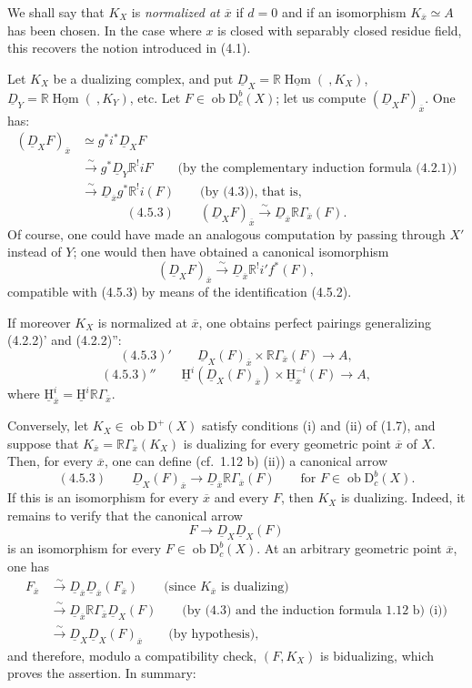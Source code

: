 \documentclass[11pt]{article}
\providecommand{\uH}{\underline{\mathrm H}}
\DeclareMathOperator{\Hom}{Hom}
\newcommand{\D}{\mathrm{D}}
\newcommand{\ob}{\operatorname{ob}}
\newcommand{\ol}[1]{\overline{#1}}
\providecommand{\Hom}{\operatorname{Hom}}
\providecommand{\ob}{\operatorname{ob}}
\providecommand{\Hom}{\operatorname{Hom}}
\begin{document}
We shall say that $K_X$ is \emph{normalized at $\ol{x}$} if $d=0$ and if an isomorphism $K_{\ol{x}}\simeq A$ has been chosen. In the case where $x$ is closed with separably closed residue field, this recovers the notion introduced in (4.1).

Let $K_X$ be a dualizing complex, and put $\underline{D}_X=\mathbb{R}\underline{\Hom}(\ ,K_X)$, $\underline{D}_Y=\mathbb{R}\underline{\Hom}(\ ,K_Y)$, etc. Let $F\in\ob\D_c^b(X)$; let us compute $(\underline{D}_XF)_{\ol{x}}$. One has:
\[
\begin{aligned}
(\underline{D}_XF)_{\ol{x}}&\simeq g^*i^*\underline{D}_X F\\
&\xrightarrow{\sim}g^*\underline{D}_Y\mathbb{R}^{!}iF\qquad\text{(by the complementary induction formula (4.2.1))}\\
&\xrightarrow{\sim}\underline{D}_{\ol{x}}g^*\mathbb{R}^{!}i(F)\qquad\text{(by (4.3)), that is,}
\end{aligned}
\]
\[
(4.5.3)\qquad (\underline{D}_X F)_{\ol{x}}\xrightarrow{\sim}\underline{D}_{\ol{x}}\mathbb{R}\Gamma_{\ol{x}}(F).
\]
Of course, one could have made an analogous computation by passing through $X'$ instead of $Y$; one would then have obtained a canonical isomorphism
\[
(\underline{D}_XF)_{\ol{x}}\xrightarrow{\sim}\underline{D}_{\ol{x}}\mathbb{R}^{!}i'f^*(F),
\]
compatible with (4.5.3) by means of the identification (4.5.2).

If moreover $K_X$ is normalized at $\ol{x}$, one obtains perfect pairings generalizing (4.2.2)' and (4.2.2)'':
\[
(4.5.3)'\qquad \underline{D}_X(F)_{\ol{x}}\times \mathbb{R}\Gamma_{\ol{x}}(F)\longrightarrow A,
\]
\[
(4.5.3)''\qquad \uH^i(\underline{D}_X(F)_{\ol{x}})\times \uH_{\ol{x}}^{-i}(F)\longrightarrow A,
\]
where $\uH_{\ol{x}}^i=\uH^i\mathbb{R}\Gamma_{\ol{x}}$.

Conversely, let $K_X\in\ob\D^+(X)$ satisfy conditions (i) and (ii) of (1.7), and suppose that $K_{\ol{x}}=\mathbb{R}\Gamma_{\ol{x}}(K_X)$ is dualizing for every geometric point $\ol{x}$ of $X$. Then, for every $\ol{x}$, one can define (cf.~1.12 b) (ii)) a canonical arrow
\[
(4.5.3)\qquad \underline{D}_X(F)_{\ol{x}}\longrightarrow \underline{D}_{\ol{x}}\mathbb{R}\Gamma_{\ol{x}}(F)\qquad \text{for } F\in\ob\D_c^b(X).
\]
If this is an isomorphism for every $\ol{x}$ and every $F$, then $K_X$ is dualizing. Indeed, it remains to verify that the canonical arrow
\[
F\longrightarrow \underline{D}_X\underline{D}_X(F)
\]
is an isomorphism for every $F\in\ob\D_c^b(X)$. At an arbitrary geometric point $\ol{x}$, one has
\[
\begin{aligned}
F_{\ol{x}}&\xrightarrow{\sim}\underline{D}_{\ol{x}}\underline{D}_{\ol{x}}(F_{\ol{x}})\qquad\text{(since $K_{\ol{x}}$ is dualizing)}\\
&\xrightarrow{\sim}\underline{D}_{\ol{x}}\mathbb{R}\Gamma_{\ol{x}}\underline{D}_X(F)\qquad\text{(by (4.3) and the induction formula 1.12 b) (i))}\\
&\xrightarrow{\sim}\underline{D}_X\underline{D}_X(F)_{\ol{x}}\qquad\text{(by hypothesis)},
\end{aligned}
\]
and therefore, modulo a compatibility check, $(F,K_X)$ is bidualizing, which proves the assertion. In summary:
\end{document}
